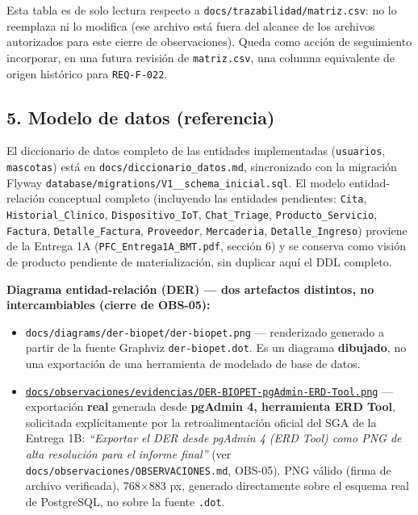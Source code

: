 \documentclass[
]{article}
\providecommand{\tightlist}{%
  \setlength{\itemsep}{0pt}\setlength{\parskip}{0pt}}
\begin{document}
Esta tabla es de solo lectura respecto a
\texttt{docs/trazabilidad/matriz.csv}: no lo reemplaza ni lo modifica
(ese archivo está fuera del alcance de los archivos autorizados para
este cierre de observaciones). Queda como acción de seguimiento
incorporar, en una futura revisión de \texttt{matriz.csv}, una columna
equivalente de origen histórico para \texttt{REQ-F-022}.

\hypertarget{modelo-de-datos-referencia}{%
\subsection{5. Modelo de datos
(referencia)}\label{modelo-de-datos-referencia}}

El diccionario de datos completo de las entidades implementadas
(\texttt{usuarios}, \texttt{mascotas}) está en
\texttt{docs/diccionario\_datos.md}, sincronizado con la migración
Flyway \texttt{database/migrations/V1\_\_schema\_inicial.sql}. El modelo
entidad-relación conceptual completo (incluyendo las entidades
pendientes: \texttt{Cita}, \texttt{Historial\_Clinico},
\texttt{Dispositivo\_IoT}, \texttt{Chat\_Triage},
\texttt{Producto\_Servicio}, \texttt{Factura},
\texttt{Detalle\_Factura}, \texttt{Proveedor}, \texttt{Mercaderia},
\texttt{Detalle\_Ingreso}) proviene de la Entrega 1A
(\texttt{PFC\_Entrega1A\_BMT.pdf}, sección 6) y se conserva como visión
de producto pendiente de materialización, sin duplicar aquí el DDL
completo.

\textbf{Diagrama entidad-relación (DER) --- dos artefactos distintos, no
intercambiables (cierre de OBS-05):}

\begin{itemize}
\tightlist
\item
  \texttt{docs/diagrams/der-biopet/der-biopet.png} --- renderizado
  generado a partir de la fuente Graphviz \texttt{der-biopet.dot}. Es un
  diagrama \textbf{dibujado}, no una exportación de una herramienta de
  modelado de base de datos.
\item
  \href{../observaciones/evidencias/DER-BIOPET-pgAdmin-ERD-Tool.png}{\texttt{docs/observaciones/evidencias/DER-BIOPET-pgAdmin-ERD-Tool.png}}
  --- exportación \textbf{real} generada desde \textbf{pgAdmin 4,
  herramienta ERD Tool}, solicitada explícitamente por la
  retroalimentación oficial del SGA de la Entrega 1B: \emph{``Exportar
  el DER desde pgAdmin 4 (ERD Tool) como PNG de alta resolución para el
  informe final''} (ver \texttt{docs/observaciones/OBSERVACIONES.md},
  OBS-05). PNG válido (firma de archivo verificada), 768×883 px,
  generado directamente sobre el esquema real de PostgreSQL, no sobre la
  fuente \texttt{.dot}.
\end{itemize}
\end{document}
